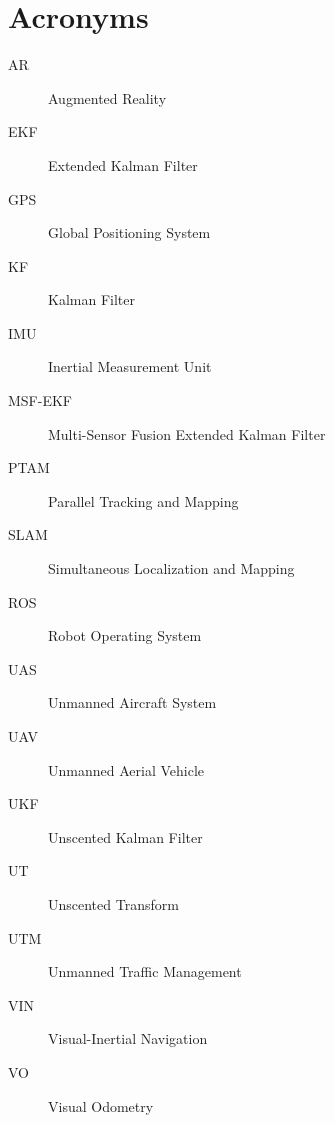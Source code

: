 \chapter*{Acronyms}

\begin{description}
\item [AR] Augmented Reality
\item [EKF] Extended Kalman Filter
\item [GPS] Global Positioning System
\item [KF] Kalman Filter
\item [IMU] Inertial Measurement Unit
\item [MSF-EKF] Multi-Sensor Fusion Extended Kalman Filter
\item [PTAM] Parallel Tracking and Mapping
\item [SLAM] Simultaneous Localization and Mapping
\item [ROS] Robot Operating System
\item [UAS] Unmanned Aircraft System
\item [UAV] Unmanned Aerial Vehicle
\item [UKF] Unscented Kalman Filter
\item [UT] Unscented Transform
\item [UTM] Unmanned Traffic Management
\item [VIN] Visual-Inertial Navigation
\item [VO] Visual Odometry
\end{description}